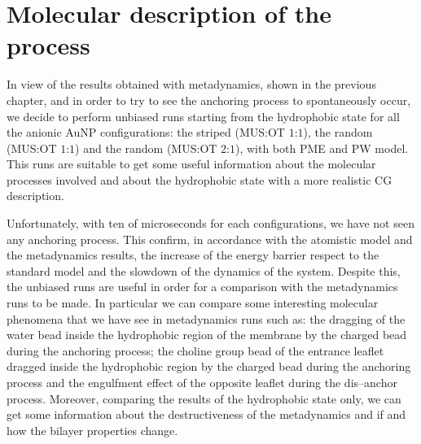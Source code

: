 \chapter{Molecular description of the process}
In view of the results obtained with metadynamics, shown in the previous chapter, and in order to try to see the anchoring process to spontaneously occur, we decide to perform unbiased runs starting from the hydrophobic state for all the anionic \ac{AuNP} configurations: the striped (\ac{MUS}:\ac{OT} $1$:$1$), the random (\ac{MUS}:\ac{OT} $1$:$1$) and the random (\ac{MUS}:\ac{OT} $2$:$1$), with both \ac{PME} and \ac{PW} model. This runs are suitable to get some useful information about the molecular processes involved and about the hydrophobic state with a more realistic \ac{CG} description.

Unfortunately, with ten of microseconds for each configurations, we have not seen any anchoring process. This confirm, in accordance with the atomistic model and the metadynamics results, the increase of the energy barrier respect to the standard \martini model and the slowdown of the dynamics of the system. Despite this, the unbiased runs are useful in order for a comparison with the metadynamics runs to be made. In particular we can compare some interesting molecular phenomena that we have see in metadynamics runs such as: the dragging of the water bead inside the hydrophobic region of the membrane by the charged bead during the anchoring process; the choline group bead of the entrance leaflet dragged inside the hydrophobic region by the charged bead during the anchoring process and the engulfment effect of the opposite leaflet during the dis--anchor process. Moreover, comparing the results of the hydrophobic state only, we can get some information about the destructiveness of the metadynamics and if and how the bilayer properties change. 


